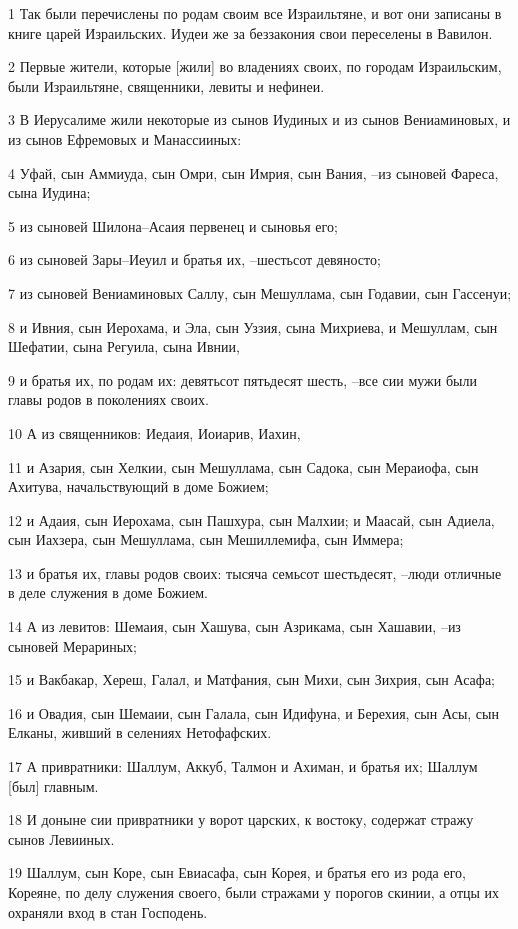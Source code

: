 \par 1 Так были перечислены по родам своим все Израильтяне, и вот они записаны в книге царей Израильских. Иудеи же за беззакония свои переселены в Вавилон.
\par 2 Первые жители, которые [жили] во владениях своих, по городам Израильским, были Израильтяне, священники, левиты и нефинеи.
\par 3 В Иерусалиме жили некоторые из сынов Иудиных и из сынов Вениаминовых, и из сынов Ефремовых и Манассииных:
\par 4 Уфай, сын Аммиуда, сын Омри, сын Имрия, сын Вания, --из сыновей Фареса, сына Иудина;
\par 5 из сыновей Шилона--Асаия первенец и сыновья его;
\par 6 из сыновей Зары--Иеуил и братья их, --шестьсот девяносто;
\par 7 из сыновей Вениаминовых Саллу, сын Мешуллама, сын Годавии, сын Гассенуи;
\par 8 и Ивния, сын Иерохама, и Эла, сын Уззия, сына Михриева, и Мешуллам, сын Шефатии, сына Регуила, сына Ивнии,
\par 9 и братья их, по родам их: девятьсот пятьдесят шесть, --все сии мужи были главы родов в поколениях своих.
\par 10 А из священников: Иедаия, Иоиарив, Иахин,
\par 11 и Азария, сын Хелкии, сын Мешуллама, сын Садока, сын Мераиофа, сын Ахитува, начальствующий в доме Божием;
\par 12 и Адаия, сын Иерохама, сын Пашхура, сын Малхии; и Маасай, сын Адиела, сын Иахзера, сын Мешуллама, сын Мешиллемифа, сын Иммера;
\par 13 и братья их, главы родов своих: тысяча семьсот шестьдесят, --люди отличные в деле служения в доме Божием.
\par 14 А из левитов: Шемаия, сын Хашува, сын Азрикама, сын Хашавии, --из сыновей Мерариных;
\par 15 и Вакбакар, Хереш, Галал, и Матфания, сын Михи, сын Зихрия, сын Асафа;
\par 16 и Овадия, сын Шемаии, сын Галала, сын Идифуна, и Берехия, сын Асы, сын Елканы, живший в селениях Нетофафских.
\par 17 А привратники: Шаллум, Аккуб, Талмон и Ахиман, и братья их; Шаллум [был] главным.
\par 18 И доныне сии привратники у ворот царских, к востоку, содержат стражу сынов Левииных.
\par 19 Шаллум, сын Коре, сын Евиасафа, сын Корея, и братья его из рода его, Кореяне, по делу служения своего, были стражами у порогов скинии, а отцы их охраняли вход в стан Господень.
